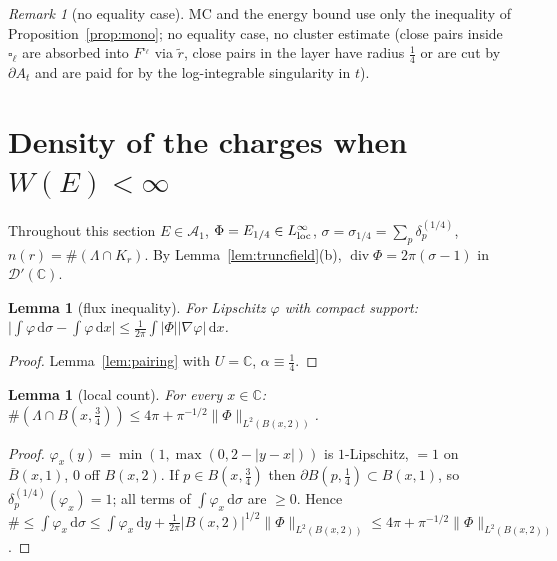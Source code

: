 \documentclass[11pt]{article}
\newtheorem{lemma}[theorem]{Lemma}
\theoremstyle{definition}
\theoremstyle{remark}
\newtheorem{remark}[theorem]{Remark}
\newcommand{\C}{\mathbb C}
\newcommand{\dd}{\,\mathrm d}
\newcommand{\Lam}{\Lambda}
\DeclareMathOperator{\Div}{div}
\begin{document}
\begin{remark}[no equality case]\label{rem:noE1}
MC and the energy bound use only the inequality of Proposition~\ref{prop:mono}; no equality case, no cluster estimate (close pairs inside $\square_\ell$ are absorbed into $F^{\square_\ell}$ via $\tilde r$, close pairs in the layer have radius $\frac14$ or are cut by $\partial A_t$ and are paid for by the log-integrable singularity in $t$).
\end{remark}

\section{Density of the charges when $W(E)<\infty$}\label{sec:density}

Throughout this section $E\in\mathcal A_1$, $\Phi=E_{1/4}\in L^\infty_{\rm loc}$, $\sigma=\sigma_{1/4}=\sum_p\delta_p^{(1/4)}$, $n(r)=\#(\Lam\cap K_r)$.  By Lemma~\ref{lem:truncfield}(b), $\Div\Phi=2\pi(\sigma-1)$ in $\mathcal D'(\C)$.

\begin{lemma}[flux inequality]\label{lem:flux}
For Lipschitz $\varphi$ with compact support: $\bigl|\int\varphi\dd\sigma-\int\varphi\dd x\bigr|\le\frac1{2\pi}\int|\Phi||\nabla\varphi|\dd x$.
\end{lemma}
\begin{proof}Lemma~\ref{lem:pairing} with $U=\C$, $\alpha\equiv\frac14$.\end{proof}

\begin{lemma}[local count]\label{lem:localcount}
For every $x\in\C$: $\#(\Lam\cap B(x,\frac34))\le4\pi+\pi^{-1/2}\|\Phi\|_{L^2(B(x,2))}$.
\end{lemma}
\begin{proof}
$\varphi_x(y)=\min(1,\max(0,2-|y-x|))$ is $1$-Lipschitz, $=1$ on $\bar B(x,1)$, $0$ off $B(x,2)$.  If $p\in B(x,\frac34)$ then $\partial B(p,\frac14)\subset B(x,1)$, so $\delta_p^{(1/4)}(\varphi_x)=1$; all terms of $\int\varphi_x\dd\sigma$ are $\ge0$.  Hence
$\#\le\int\varphi_x\dd\sigma\le\int\varphi_x\dd y+\frac1{2\pi}|B(x,2)|^{1/2}\|\Phi\|_{L^2(B(x,2))}\le4\pi+\pi^{-1/2}\|\Phi\|_{L^2(B(x,2))}$.
\end{proof}
\end{document}

